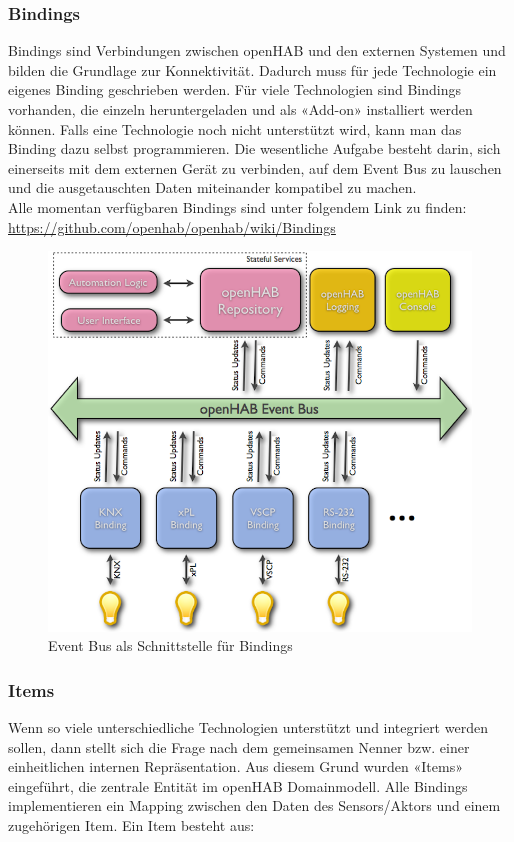\subsubsection{Bindings}
Bindings sind Verbindungen zwischen openHAB und den externen Systemen und bilden die Grundlage zur Konnektivität. Dadurch muss für jede Technologie ein eigenes Binding geschrieben werden. Für viele Technologien sind Bindings vorhanden, die einzeln heruntergeladen und als «Add-on» installiert werden können. Falls eine Technologie noch nicht unterstützt wird, kann man das Binding dazu selbst programmieren. Die wesentliche Aufgabe besteht darin, sich einerseits mit dem externen Gerät zu verbinden, auf dem Event Bus zu lauschen und die ausgetauschten Daten miteinander kompatibel zu machen. \\
Alle momentan verfügbaren Bindings sind unter folgendem Link zu finden: \url{https://github.com/openhab/openhab/wiki/Bindings}

\begin{figure}[H]
	\centering
		\includegraphics[scale=0.4]{report/img/communicationOH}
	\caption{Event Bus als Schnittstelle für Bindings}
	\label{fig:ohComm}
\end{figure}



\subsubsection{Items}
Wenn so viele unterschiedliche Technologien unterstützt und integriert werden sollen, dann stellt sich die Frage nach dem gemeinsamen Nenner bzw. einer einheitlichen internen Repräsentation. Aus diesem Grund wurden «Items» eingeführt, die zentrale Entität im openHAB Domainmodell. Alle Bindings implementieren ein Mapping zwischen den Daten des Sensors/Aktors und einem zugehörigen Item. Ein Item besteht aus:

